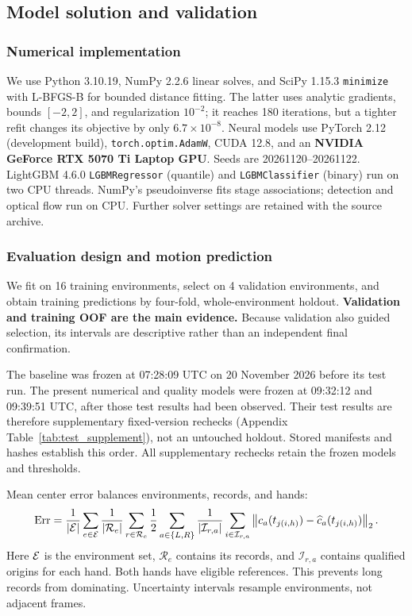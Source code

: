 \subsection{Model solution and validation}
\subsubsection{Numerical implementation}
We use Python 3.10.19, NumPy 2.2.6 linear solves, and SciPy 1.15.3 \texttt{minimize} with L-BFGS-B for bounded distance fitting. The latter uses analytic gradients, bounds $[-2,2]$, and regularization $10^{-2}$; it reaches 180 iterations, but a tighter refit changes its objective by only $6.7\times10^{-8}$. Neural models use PyTorch 2.12 (development build), \texttt{torch.optim.AdamW}, CUDA 12.8, and an \textbf{NVIDIA GeForce RTX 5070 Ti Laptop GPU}. Seeds are 20261120--20261122. LightGBM 4.6.0 \texttt{LGBMRegressor} (quantile) and \texttt{LGBMClassifier} (binary) run on two CPU threads. NumPy's pseudoinverse fits stage associations; detection and optical flow run on CPU. Further solver settings are retained with the source archive.

\subsubsection{Evaluation design and motion prediction}
We fit on 16 training environments, select on 4 validation environments, and obtain training predictions by four-fold, whole-environment holdout. \textbf{Validation and training OOF are the main evidence.} Because validation also guided selection, its intervals are descriptive rather than an independent final confirmation.

The baseline was frozen at 07:28:09 UTC on 20 November 2026 before its test run. The present numerical and quality models were frozen at 09:32:12 and 09:39:51 UTC, after those test results had been observed. Their test results are therefore supplementary fixed-version rechecks (Appendix Table~\ref{tab:test_supplement}), not an untouched holdout. Stored manifests and hashes establish this order. All supplementary rechecks retain the frozen models and thresholds.

Mean center error balances environments, records, and hands:
\begin{equation}
\operatorname{Err}=
\frac{1}{|\mathcal{E}|}\sum_{e\in\mathcal{E}}\frac{1}{|\mathcal R_e|}
\sum_{r\in\mathcal R_e}\frac12\sum_{a\in\{L,R\}}
\frac{1}{|\mathcal I_{r,a}|}\sum_{i\in\mathcal I_{r,a}}
\left\lVert c_a(t_{j(i,h)})-\widehat c_a(t_{j(i,h)})\right\rVert_2.
\label{eq:metric}
\end{equation}
\noindent Here $\mathcal{E}$ is the environment set, $\mathcal R_e$ contains its records, and $\mathcal I_{r,a}$ contains qualified origins for each hand. Both hands have eligible references. This prevents long records from dominating. Uncertainty intervals resample environments, not adjacent frames.

